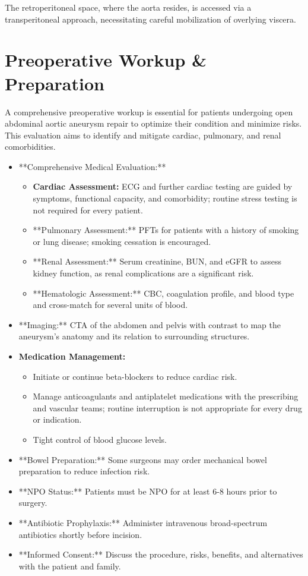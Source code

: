 The retroperitoneal space, where the aorta resides, is accessed via a transperitoneal approach, necessitating careful mobilization of overlying viscera.

\section*{Preoperative Workup \& Preparation}
A comprehensive preoperative workup is essential for patients undergoing open abdominal aortic aneurysm repair to optimize their condition and minimize risks. This evaluation aims to identify and mitigate cardiac, pulmonary, and renal comorbidities.

\begin{itemize}
  \item **Comprehensive Medical Evaluation:**
    \begin{itemize}
      \item \textbf{Cardiac Assessment:} ECG and further cardiac testing are guided by symptoms, functional capacity, and comorbidity; routine stress testing is not required for every patient.
      \item **Pulmonary Assessment:** PFTs for patients with a history of smoking or lung disease; smoking cessation is encouraged.
      \item **Renal Assessment:** Serum creatinine, BUN, and eGFR to assess kidney function, as renal complications are a significant risk.
      \item **Hematologic Assessment:** CBC, coagulation profile, and blood type and cross-match for several units of blood.
    \end{itemize}
  \item **Imaging:** CTA of the abdomen and pelvis with contrast to map the aneurysm's anatomy and its relation to surrounding structures.
      \item \textbf{Medication Management:}
    \begin{itemize}
      \item Initiate or continue beta-blockers to reduce cardiac risk.
      \item Manage anticoagulants and antiplatelet medications with the prescribing and vascular teams; routine interruption is not appropriate for every drug or indication.
      \item Tight control of blood glucose levels.
    \end{itemize}
  \item **Bowel Preparation:** Some surgeons may order mechanical bowel preparation to reduce infection risk.
  \item **NPO Status:** Patients must be NPO for at least 6-8 hours prior to surgery.
  \item **Antibiotic Prophylaxis:** Administer intravenous broad-spectrum antibiotics shortly before incision.
  \item **Informed Consent:** Discuss the procedure, risks, benefits, and alternatives with the patient and family.
\end{itemize}

